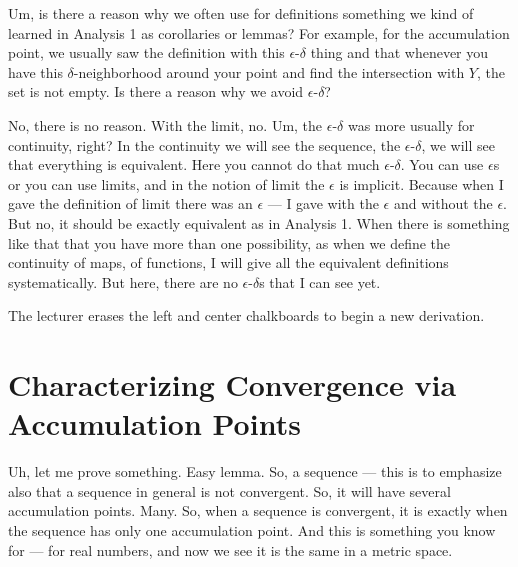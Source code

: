 \begin{student-question}
Um, is there a reason why we often use for definitions something we kind of learned in Analysis 1 as corollaries or lemmas? For example, for the accumulation point, we usually saw the definition with this $\epsilon$-$\delta$ thing and that whenever you have this $\delta$-neighborhood around your point and find the intersection with $Y$, the set is not empty. Is there a reason why we avoid $\epsilon$-$\delta$?
\end{student-question}

\begin{spoken-clean}[00:02:12 - 00:03:12]
No, there is no reason. With the limit, no. Um, the $\epsilon$-$\delta$ was more usually for continuity, right? In the continuity we will see the sequence, the $\epsilon$-$\delta$, we will see that everything is equivalent. Here you cannot do that much $\epsilon$-$\delta$. You can use $\epsilon$s or you can use limits, and in the notion of limit the $\epsilon$ is implicit. Because when I gave the definition of limit there was an $\epsilon$ — I gave with the $\epsilon$ and without the $\epsilon$. But no, it should be exactly equivalent as in Analysis 1. When there is something like that that you have more than one possibility, as when we define the continuity of maps, of functions, I will give all the equivalent definitions systematically. But here, there are no $\epsilon$-$\delta$s that I can see yet.
\end{spoken-clean}

\begin{meta-note}[Transition]
The lecturer erases the left and center chalkboards to begin a new derivation.
\end{meta-note}

\section{Characterizing Convergence via Accumulation Points}

\begin{spoken-clean}[00:03:13 - 00:05:03]
Uh, let me prove something. Easy lemma. So, a sequence — this is to emphasize also that a sequence in general is not convergent. So, it will have several accumulation points. Many. So, when a sequence is convergent, it is exactly when the sequence has only one accumulation point. And this is something you know for — for real numbers, and now we see it is the same in a metric space.
\end{spoken-clean}

